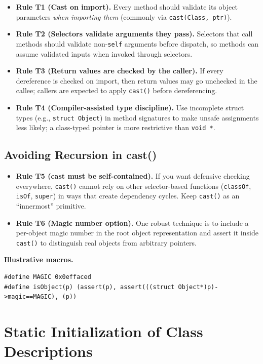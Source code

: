 \documentclass[11pt]{article}
\begin{document}
\begin{itemize}
  \item \textbf{Rule T1 (Cast on import).} Every method should validate its object parameters \emph{when importing them} (commonly via \texttt{cast(Class, ptr)}).
  \item \textbf{Rule T2 (Selectors validate arguments they pass).} Selectors that call methods should validate non-\texttt{self} arguments before dispatch, so methods can assume validated inputs when invoked through selectors.
  \item \textbf{Rule T3 (Return values are checked by the caller).} If every dereference is checked on import, then return values may go unchecked in the callee; callers are expected to apply \texttt{cast()} before dereferencing.
  \item \textbf{Rule T4 (Compiler-assisted type discipline).} Use incomplete struct types (e.g., \texttt{struct Object}) in method signatures to make unsafe assignments less likely; a class-typed pointer is more restrictive than \texttt{void *}.
\end{itemize}

\subsection{Avoiding Recursion in cast()}

\begin{itemize}
  \item \textbf{Rule T5 (cast must be self-contained).} If you want defensive checking everywhere, \texttt{cast()} cannot rely on other selector-based functions (\texttt{classOf}, \texttt{isOf}, \texttt{super}) in ways that create dependency cycles. Keep \texttt{cast()} as an ``innermost'' primitive.
  \item \textbf{Rule T6 (Magic number option).} One robust technique is to include a per-object magic number in the root object representation and assert it inside \texttt{cast()} to distinguish real objects from arbitrary pointers.
\end{itemize}

\noindent\textbf{Illustrative macros.}
\begin{verbatim}
#define MAGIC 0x0effaced
#define isObject(p) (assert(p), assert(((struct Object*)p)->magic==MAGIC), (p))
\end{verbatim}

\section{Static Initialization of Class Descriptions}
\end{document}
